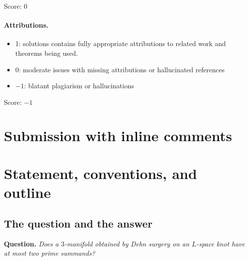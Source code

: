 \documentclass[11pt]{article}
\theoremstyle{definition}
\theoremstyle{remark}
\begin{document}
\noindent Score: $0$

\paragraph{Attributions.}
\begin{itemize}
	\item  1: solutions contains fully appropriate attributions
		to related work and theorems being used.
	\item  0: moderate issues with missing attributions or hallucinated references
	\item  $-1$: blatant plagiarism or hallucinations
\end{itemize}

\noindent Score: $-1$

\newpage
\section{Submission with inline comments}


\begin{abstract}
\noindent We answer the question affirmatively: every closed $3$-manifold
obtained by Dehn surgery on an $L$-space knot $K\subset S^{3}$ has at most two
prime summands.  More precisely we show that such a manifold is either prime,
or the connected sum of exactly two prime rational homology spheres; the
second alternative occurs exactly for the cabling surgery on a cabled
$L$-space knot (e.g.\ $6$-surgery on the right-handed trefoil
$L(2,3)\,\#\,L(3,2)$).  The non-elementary inputs are stated precisely where
they are used; the reductions, the splitting computation for cabling
surgeries, and the case analysis are proved in full.
\end{abstract}

\section{Statement, conventions, and outline}

\subsection{The question and the answer}

\textbf{Question.} \emph{Does a $3$-manifold obtained by Dehn surgery on an
$L$-space knot have at most two prime summands?}
\end{document}
